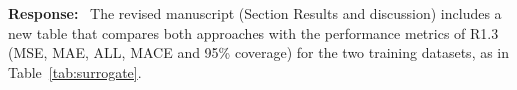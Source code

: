 \documentclass[11pt]{article}
\newenvironment{response}{\par\smallskip\noindent\color{resp}\textbf{Response:}\ }{\par}
\newcommand{\m}{\mathbf{m}}
\newcommand{\z}{\mathbf{z}}
\begin{document}
\begin{response}
	The revised manuscript (Section Results and discussion) includes a new table that compares both approaches with the performance metrics of R1.3 (MSE, MAE, ALL, MACE and 95\% coverage) for the two training datasets, as in Table~\ref{tab:surrogate}.



\end{response}
\end{document}
